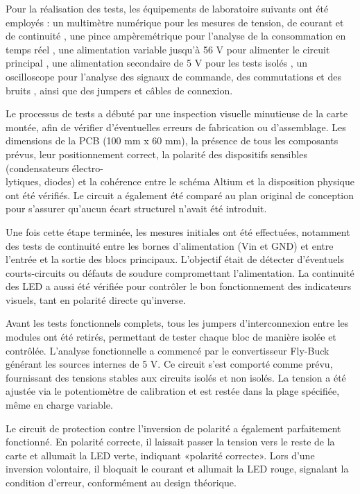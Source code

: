 Pour la réalisation des tests, les équipements de laboratoire suivants ont été employés : un multimètre numérique pour les mesures de tension, de courant et de continuité , une pince ampèremétrique pour l'analyse de la consommation en temps réel , une alimentation variable jusqu'à 56 V pour alimenter le circuit principal , une alimentation secondaire de 5 V pour les tests isolés , un oscilloscope pour l'analyse des signaux de commande, des commutations et des bruits , ainsi que des jumpers et câbles de connexion.

Le processus de tests a débuté par une inspection visuelle minutieuse de la carte montée, afin de vérifier d'éventuelles erreurs de fabrication ou d'assemblage. Les dimensions de la PCB (100 mm x 60 mm), la présence de tous les composants prévus, leur positionnement correct, la polarité des dispositifs sensibles (condensateurs électro-\\ lytiques, diodes) et la cohérence entre le schéma Altium et la disposition physique ont été vérifiés. Le circuit a également été comparé au plan original de conception pour s'assurer qu'aucun écart structurel n'avait été introduit.

Une fois cette étape terminée, les mesures initiales ont été effectuées, notamment des tests de continuité entre les bornes d'alimentation (Vin et GND) et entre l'entrée et la sortie des blocs principaux. L'objectif était de détecter d'éventuels courts-circuits ou défauts de soudure compromettant l'alimentation. La continuité des LED a aussi été vérifiée pour contrôler le bon fonctionnement des indicateurs visuels, tant en polarité directe qu'inverse.

Avant les tests fonctionnels complets, tous les jumpers d'interconnexion entre les modules ont été retirés, permettant de tester chaque bloc de manière isolée et contrôlée. L'analyse fonctionnelle a commencé par le convertisseur Fly-Buck générant les sources internes de 5 V. Ce circuit s'est comporté comme prévu, fournissant des tensions stables aux circuits isolés et non isolés. La tension a été ajustée via le potentiomètre de calibration et est restée dans la plage spécifiée, même en charge variable.

Le circuit de protection contre l'inversion de polarité a également parfaitement fonctionné. En polarité correcte, il laissait passer la tension vers le reste de la carte et allumait la LED verte, indiquant «polarité correcte». Lors d'une inversion volontaire, il bloquait le courant et allumait la LED rouge, signalant la condition d'erreur, conformément au design théorique.

